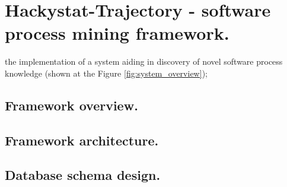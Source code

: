 \chapter{Hackystat-Trajectory - software process mining framework.}
the implementation of a system aiding in discovery of novel software process knowledge (shown at the Figure \ref{fig:system_overview});

\section{Framework overview.}

\section{Framework architecture.}

\section{Database schema design.}